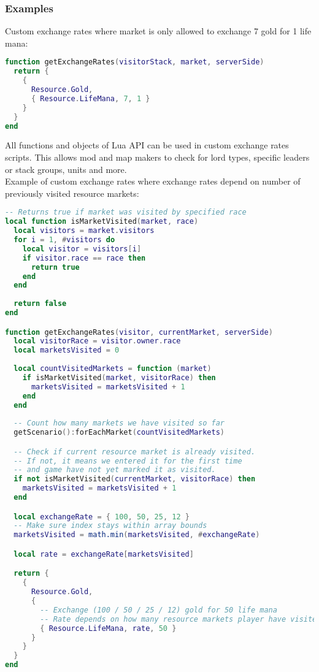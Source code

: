 \subsubsection{Examples}
Custom exchange rates where market is only allowed to exchange 7 gold for 1 life mana:
\begin{center}
\begin{lstlisting}[language=Lua]
function getExchangeRates(visitorStack, market, serverSide)
  return {
    {
      Resource.Gold,
      { Resource.LifeMana, 7, 1 }
    }
  }
end
\end{lstlisting}
\end{center}
\newpage
All functions and objects of Lua API can be used in custom exchange rates scripts. This allows mod and map makers to check for lord types, specific leaders or stack groups, units and more.\\
Example of custom exchange rates where exchange rates depend on number of previously visited resource markets:
\begin{center}
\begin{lstlisting}[language=Lua]
-- Returns true if market was visited by specified race
local function isMarketVisited(market, race)
  local visitors = market.visitors
  for i = 1, #visitors do
    local visitor = visitors[i]
    if visitor.race == race then
      return true
    end
  end
  
  return false
end

function getExchangeRates(visitor, currentMarket, serverSide)
  local visitorRace = visitor.owner.race
  local marketsVisited = 0
  
  local countVisitedMarkets = function (market)
    if isMarketVisited(market, visitorRace) then
      marketsVisited = marketsVisited + 1
    end
  end
  
  -- Count how many markets we have visited so far
  getScenario():forEachMarket(countVisitedMarkets)

  -- Check if current resource market is already visited.
  -- If not, it means we entered it for the first time
  -- and game have not yet marked it as visited.
  if not isMarketVisited(currentMarket, visitorRace) then
    marketsVisited = marketsVisited + 1
  end

  local exchangeRate = { 100, 50, 25, 12 }
  -- Make sure index stays within array bounds
  marketsVisited = math.min(marketsVisited, #exchangeRate)

  local rate = exchangeRate[marketsVisited]

  return {
    {
      Resource.Gold,
      {
        -- Exchange (100 / 50 / 25 / 12) gold for 50 life mana
        -- Rate depends on how many resource markets player have visited so far
        { Resource.LifeMana, rate, 50 }
      }
    }
  }
end
\end{lstlisting}
\end{center}